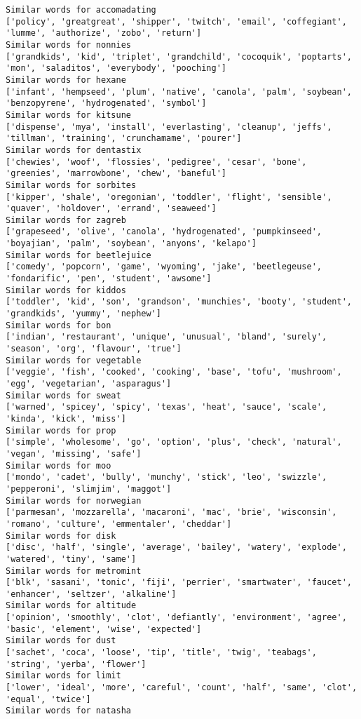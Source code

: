 \documentclass[11pt]{article}
\begin{document}
\begin{Verbatim}[commandchars=\\\{\}]
Similar words for accomadating
['policy', 'greatgreat', 'shipper', 'twitch', 'email', 'coffegiant', 'lumme', 'authorize', 'zobo', 'return']
Similar words for nonnies
['grandkids', 'kid', 'triplet', 'grandchild', 'cocoquik', 'poptarts', 'mon', 'saladitos', 'everybody', 'pooching']
Similar words for hexane
['infant', 'hempseed', 'plum', 'native', 'canola', 'palm', 'soybean', 'benzopyrene', 'hydrogenated', 'symbol']
Similar words for kitsune
['dispense', 'mya', 'install', 'everlasting', 'cleanup', 'jeffs', 'tillman', 'training', 'crunchamame', 'pourer']
Similar words for dentastix
['chewies', 'woof', 'flossies', 'pedigree', 'cesar', 'bone', 'greenies', 'marrowbone', 'chew', 'baneful']
Similar words for sorbites
['kipper', 'shale', 'oregonian', 'toddler', 'flight', 'sensible', 'quaver', 'holdover', 'errand', 'seaweed']
Similar words for zagreb
['grapeseed', 'olive', 'canola', 'hydrogenated', 'pumpkinseed', 'boyajian', 'palm', 'soybean', 'anyons', 'kelapo']
Similar words for beetlejuice
['comedy', 'popcorn', 'game', 'wyoming', 'jake', 'beetlegeuse', 'fondarific', 'pen', 'student', 'awsome']
Similar words for kiddos
['toddler', 'kid', 'son', 'grandson', 'munchies', 'booty', 'student', 'grandkids', 'yummy', 'nephew']
Similar words for bon
['indian', 'restaurant', 'unique', 'unusual', 'bland', 'surely', 'season', 'org', 'flavour', 'true']
Similar words for vegetable
['veggie', 'fish', 'cooked', 'cooking', 'base', 'tofu', 'mushroom', 'egg', 'vegetarian', 'asparagus']
Similar words for sweat
['warned', 'spicey', 'spicy', 'texas', 'heat', 'sauce', 'scale', 'kinda', 'kick', 'miss']
Similar words for prop
['simple', 'wholesome', 'go', 'option', 'plus', 'check', 'natural', 'vegan', 'missing', 'safe']
Similar words for moo
['mondo', 'cadet', 'bully', 'munchy', 'stick', 'leo', 'swizzle', 'pepperoni', 'slimjim', 'maggot']
Similar words for norwegian
['parmesan', 'mozzarella', 'macaroni', 'mac', 'brie', 'wisconsin', 'romano', 'culture', 'emmentaler', 'cheddar']
Similar words for disk
['disc', 'half', 'single', 'average', 'bailey', 'watery', 'explode', 'watered', 'tiny', 'same']
Similar words for metromint
['blk', 'sasani', 'tonic', 'fiji', 'perrier', 'smartwater', 'faucet', 'enhancer', 'seltzer', 'alkaline']
Similar words for altitude
['opinion', 'smoothly', 'clot', 'defiantly', 'environment', 'agree', 'basic', 'element', 'wise', 'expected']
Similar words for dust
['sachet', 'coca', 'loose', 'tip', 'title', 'twig', 'teabags', 'string', 'yerba', 'flower']
Similar words for limit
['lower', 'ideal', 'more', 'careful', 'count', 'half', 'same', 'clot', 'equal', 'twice']
Similar words for natasha

\end{Verbatim}
\end{document}
